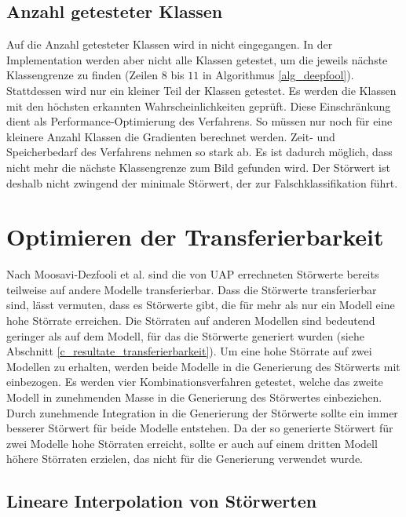 \documentclass{FFHS_Thesis_Additions/ffhsthesis}
\begin{document}
\section{Anzahl getesteter Klassen}

Auf die Anzahl getesteter Klassen wird in \cite{moosavi-dezfooli_deepfool_2016} nicht eingegangen.
In der Implementation werden aber nicht alle Klassen getestet, um die jeweils nächste Klassengrenze zu finden (Zeilen $8$ bis $11$ in Algorithmus \ref{alg_deepfool}). Stattdessen wird nur ein kleiner Teil der Klassen getestet. Es werden die Klassen mit den höchsten erkannten Wahrscheinlichkeiten geprüft. Diese Einschränkung dient als Performance-Optimierung des Verfahrens. So müssen nur noch für eine kleinere Anzahl Klassen die Gradienten berechnet werden. Zeit- und Speicherbedarf des Verfahrens nehmen so stark ab. Es ist dadurch möglich, dass nicht mehr die nächste Klassengrenze zum Bild gefunden wird. Der Störwert ist deshalb nicht zwingend der minimale Störwert, der zur Falschklassifikation führt.

\chapter{Optimieren der Transferierbarkeit}
\label{c_optimieren_transfer}

Nach Moosavi-Dezfooli et al. sind die von UAP errechneten Störwerte bereits teilweise auf andere Modelle transferierbar.
Dass die Störwerte transferierbar sind, lässt vermuten, dass es Störwerte gibt, die für mehr als nur ein Modell eine hohe Störrate erreichen. 
Die Störraten auf anderen Modellen sind bedeutend geringer als auf dem Modell, für das die Störwerte generiert wurden (siehe Abschnitt \ref{c_resultate_transferierbarkeit}). 
Um eine hohe Störrate auf zwei Modellen zu erhalten, werden beide Modelle in die Generierung des Störwerts mit einbezogen. 
Es werden vier Kombinationsverfahren getestet, welche das zweite Modell in zunehmenden Masse in die Generierung des Störwertes einbeziehen. 
Durch zunehmende Integration in die Generierung der Störwerte sollte ein immer besserer Störwert für beide Modelle entstehen. 
Da der so generierte Störwert für zwei Modelle hohe Störraten erreicht, sollte er auch auf einem dritten Modell höhere Störraten erzielen, das nicht für die Generierung verwendet wurde.

\section{Lineare Interpolation von Störwerten}
\end{document}
